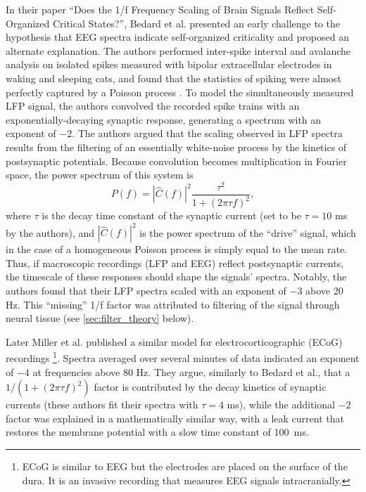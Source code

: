 In their paper ``Does the 1/f Frequency Scaling of Brain Signals Reflect Self-Organized Critical States?'', Bedard et al.\cite{Bedard2006} presented an early challenge to the hypothesis that EEG spectra indicate self-organized criticality and proposed an alternate explanation. The authors performed inter-spike interval and avalanche analysis on isolated spikes measured with bipolar extracellular electrodes in waking and sleeping cats, and found that the statistics of spiking were almost perfectly captured by a Poisson process \cite{Bedard2006}. To model the simultaneously measured LFP signal, the authors convolved the recorded spike trains with an exponentially-decaying synaptic response, generating a spectrum with an exponent of $-2$. The authors argued that the scaling observed in LFP spectra results from the filtering of an essentially white-noise process by the kinetics of postsynaptic potentials. Because convolution becomes multiplication in Fourier space, the power spectrum of this system is
\begin{equation}
P(f) =|\hat{C}(f)|^2 \frac{\tau^2} { 1+ (2\pi\tau f)^2}\mathrm{,}
\end{equation}
where $\tau$ is the decay time constant of the synaptic current (set to be $\tau=10$ \unit{\milli\second} by the authors), and $|\hat{C}(f)|^2$ is the power spectrum of the ``drive'' signal, which in the case of a homogeneous Poisson process is simply equal to the mean rate. Thus, if macroscopic recordings (LFP and EEG) reflect postsynaptic currents, the timescale of these responses should shape the signals' spectra. Notably, the authors found that their LFP spectra scaled with an exponent of $-3$ above 20 Hz. This ``missing'' 1/f factor was attributed to filtering of the signal through neural tissue (see \autoref{sec:filter_theory} below).

Later Miller et al. \cite{Miller2009} published a similar model for electrocorticographic (ECoG) recordings \footnote[2]{ECoG is similar to EEG but the electrodes are placed on the surface of the dura. It is an invasive recording that measures EEG signals intracranially.}. Spectra averaged over several minutes of data indicated an exponent of $-4$ at frequencies above 80 Hz. They argue, similarly to Bedard et al., that a $1 / (1+ (2\pi\tau f)^2)$ factor is contributed by the decay kinetics of synaptic currents (these authors fit their spectra with $\tau=4$ \unit{\milli\second}), while the additional $-2$ factor was explained in a mathematically similar way, with a leak current that restores the membrane potential with a slow time constant of \qty{100}{\milli\second}.

